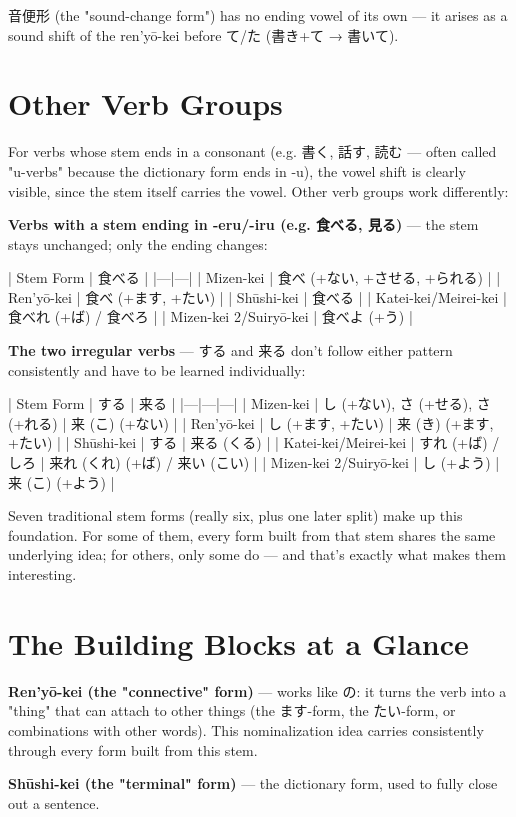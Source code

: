 \documentclass[12pt]{book}
\begin{document}
音便形 (the "sound-change form") has no ending vowel of its own — it arises as a sound shift of the ren'yō-kei before て/た (書き+て → 書いて).

\section*{Other Verb Groups}

For verbs whose stem ends in a consonant (e.g. 書く, 話す, 読む — often called "u-verbs" because the dictionary form ends in -u), the vowel shift is clearly visible, since the stem itself carries the vowel. Other verb groups work differently:

\textbf{Verbs with a stem ending in -eru/-iru (e.g. 食べる, 見る)} — the stem stays unchanged; only the ending changes:

| Stem Form | 食べる |
|---|---|
| Mizen-kei | 食べ (+ない, +させる, +られる) |
| Ren'yō-kei | 食べ (+ます, +たい) |
| Shūshi-kei | 食べる |
| Katei-kei/Meirei-kei | 食べれ (+ば) / 食べろ |
| Mizen-kei 2/Suiryō-kei | 食べよ (+う) |

\textbf{The two irregular verbs} — する and 来る don't follow either pattern consistently and have to be learned individually:

| Stem Form | する | 来る |
|---|---|---|
| Mizen-kei | し (+ない), さ (+せる), さ (+れる) | 来 (こ) (+ない) |
| Ren'yō-kei | し (+ます, +たい) | 来 (き) (+ます, +たい) |
| Shūshi-kei | する | 来る (くる) |
| Katei-kei/Meirei-kei | すれ (+ば) / しろ | 来れ (くれ) (+ば) / 来い (こい) |
| Mizen-kei 2/Suiryō-kei | し (+よう) | 来 (こ) (+よう) |

Seven traditional stem forms (really six, plus one later split) make up this foundation. For some of them, every form built from that stem shares the same underlying idea; for others, only some do — and that's exactly what makes them interesting.

\section*{The Building Blocks at a Glance}

\textbf{Ren'yō-kei (the "connective" form)} — works like の: it turns the verb into a "thing" that can attach to other things (the ます-form, the たい-form, or combinations with other words). This nominalization idea carries consistently through every form built from this stem.

\textbf{Shūshi-kei (the "terminal" form)} — the dictionary form, used to fully close out a sentence.
\end{document}
